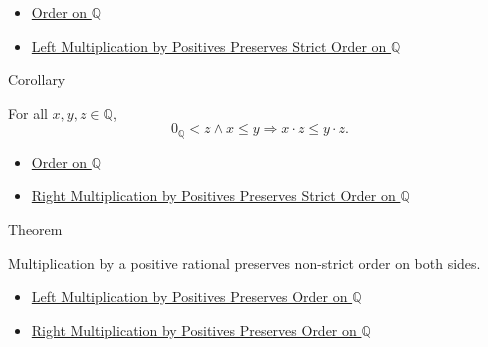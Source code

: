 \begin{dependencies}
\begin{itemize}
  \item \hyperref[def:order-on-q]{Order on $\mathbb{Q}$}
  \item \hyperref[thm:left-positive-multiplication-preserves-strict-order-on-q]{Left Multiplication by Positives Preserves Strict Order on $\mathbb{Q}$}
\end{itemize}
\end{dependencies}

\begin{corollarybox}{Corollary}
\begin{corollary}
\label{cor:right-positive-multiplication-preserves-order-on-q}
For all $x,y,z\in\mathbb{Q}$,
\[
0_{\mathbb{Q}}<z\land x\le y
\Longrightarrow
x\cdot z\le y\cdot z.
\]
\end{corollary}
\end{corollarybox}

\begin{dependencies}
\begin{itemize}
  \item \hyperref[def:order-on-q]{Order on $\mathbb{Q}$}
  \item \hyperref[cor:right-positive-multiplication-preserves-strict-order-on-q]{Right Multiplication by Positives Preserves Strict Order on $\mathbb{Q}$}
\end{itemize}
\end{dependencies}

\begin{theorembox}{Theorem}
\begin{theorem}
\label{thm:positive-multiplication-preserves-order-on-q}
Multiplication by a positive rational preserves non-strict order on both sides.
\end{theorem}
\end{theorembox}

\begin{dependencies}
\begin{itemize}
  \item \hyperref[thm:left-positive-multiplication-preserves-order-on-q]{Left Multiplication by Positives Preserves Order on $\mathbb{Q}$}
  \item \hyperref[cor:right-positive-multiplication-preserves-order-on-q]{Right Multiplication by Positives Preserves Order on $\mathbb{Q}$}
\end{itemize}
\end{dependencies}

